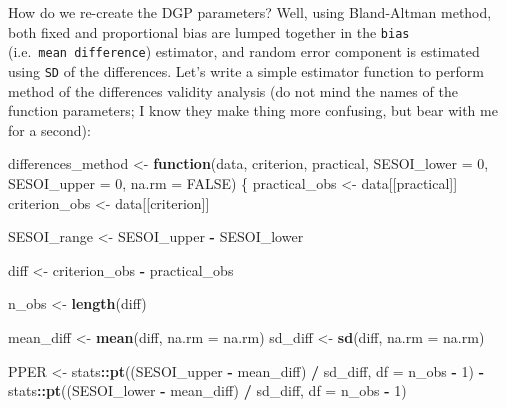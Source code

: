 \documentclass[
]{book}
\newenvironment{Shaded}{\begin{snugshade}}{\end{snugshade}}
\newcommand{\ControlFlowTok}[1]{\textcolor[rgb]{0.13,0.29,0.53}{\textbf{#1}}}
\newcommand{\DataTypeTok}[1]{\textcolor[rgb]{0.13,0.29,0.53}{#1}}
\newcommand{\DecValTok}[1]{\textcolor[rgb]{0.00,0.00,0.81}{#1}}
\newcommand{\KeywordTok}[1]{\textcolor[rgb]{0.13,0.29,0.53}{\textbf{#1}}}
\newcommand{\NormalTok}[1]{#1}
\newcommand{\OperatorTok}[1]{\textcolor[rgb]{0.81,0.36,0.00}{\textbf{#1}}}
\newcommand{\OtherTok}[1]{\textcolor[rgb]{0.56,0.35,0.01}{#1}}
\newcommand{\StringTok}[1]{\textcolor[rgb]{0.31,0.60,0.02}{#1}}
\begin{document}
How do we re-create the DGP parameters? Well, using Bland-Altman method, both fixed and proportional bias are lumped together in the \texttt{bias} (i.e.~\texttt{mean\ difference}) estimator, and random error component is estimated using \texttt{SD} of the differences. Let's write a simple estimator function to perform method of the differences validity analysis (do not mind the names of the function parameters; I know they make thing more confusing, but bear with me for a second):

\begin{Shaded}
\begin{Highlighting}[]
\NormalTok{differences\_method <{-}}\StringTok{ }\ControlFlowTok{function}\NormalTok{(data,}
\NormalTok{                               criterion,}
\NormalTok{                               practical,}
                               \DataTypeTok{SESOI\_lower =} \DecValTok{0}\NormalTok{,}
                               \DataTypeTok{SESOI\_upper =} \DecValTok{0}\NormalTok{,}
                               \DataTypeTok{na.rm =} \OtherTok{FALSE}\NormalTok{) \{}
\NormalTok{  practical\_obs <{-}}\StringTok{ }\NormalTok{data[[practical]]}
\NormalTok{  criterion\_obs <{-}}\StringTok{ }\NormalTok{data[[criterion]]}

\NormalTok{  SESOI\_range <{-}}\StringTok{ }\NormalTok{SESOI\_upper }\OperatorTok{{-}}\StringTok{ }\NormalTok{SESOI\_lower}

\NormalTok{  diff <{-}}\StringTok{ }\NormalTok{criterion\_obs }\OperatorTok{{-}}\StringTok{ }\NormalTok{practical\_obs}

\NormalTok{  n\_obs <{-}}\StringTok{ }\KeywordTok{length}\NormalTok{(diff)}

\NormalTok{  mean\_diff <{-}}\StringTok{ }\KeywordTok{mean}\NormalTok{(diff, }\DataTypeTok{na.rm =}\NormalTok{ na.rm)}
\NormalTok{  sd\_diff <{-}}\StringTok{ }\KeywordTok{sd}\NormalTok{(diff, }\DataTypeTok{na.rm =}\NormalTok{ na.rm)}

\NormalTok{  PPER <{-}}\StringTok{ }\NormalTok{stats}\OperatorTok{::}\KeywordTok{pt}\NormalTok{((SESOI\_upper }\OperatorTok{{-}}\StringTok{ }\NormalTok{mean\_diff) }\OperatorTok{/}\StringTok{ }\NormalTok{sd\_diff, }\DataTypeTok{df =}\NormalTok{ n\_obs }\OperatorTok{{-}}\StringTok{ }\DecValTok{1}\NormalTok{) }\OperatorTok{{-}}
\StringTok{    }\NormalTok{stats}\OperatorTok{::}\KeywordTok{pt}\NormalTok{((SESOI\_lower }\OperatorTok{{-}}\StringTok{ }\NormalTok{mean\_diff) }\OperatorTok{/}\StringTok{ }\NormalTok{sd\_diff, }\DataTypeTok{df =}\NormalTok{ n\_obs }\OperatorTok{{-}}\StringTok{ }\DecValTok{1}\NormalTok{)}


\end{Highlighting}
\end{Shaded}
\end{document}
